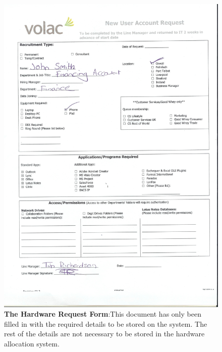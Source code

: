 \begin{figure}[H]
\includegraphics[width=.9\textwidth,height=.9\textheight,keepaspectratio]{HardwareRequestForm.jpg}
\caption{\textbf{The Hardware Request Form}:This document has only been filled in with the required details to be stored on the system. The rest of the details are not necessary to be stored in the hardware allocation system.} \label{HardwareRequestForm}
\end{figure}

